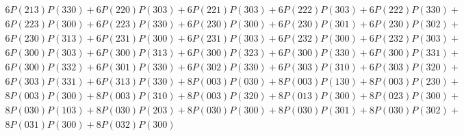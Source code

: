 \begin{align*}
	6P(213)P(330) + 6P(220)P(303) + 6P(221)P(303) + 6P(222)P(303) + 6P(222)P(330)+ \\
	6P(223)P(300) + 6P(223)P(330) + 6P(230)P(300) + 6P(230)P(301) + 6P(230)P(302)+ \\
	6P(230)P(313) + 6P(231)P(300) + 6P(231)P(303) + 6P(232)P(300) + 6P(232)P(303)+ \\
	6P(300)P(303) + 6P(300)P(313) + 6P(300)P(323) + 6P(300)P(330) + 6P(300)P(331)+ \\
	6P(300)P(332) + 6P(301)P(330) + 6P(302)P(330) + 6P(303)P(310) + 6P(303)P(320)+ \\
	6P(303)P(331) + 6P(313)P(330) + 8P(003)P(030) + 8P(003)P(130) + 8P(003)P(230)+ \\
	8P(003)P(300) + 8P(003)P(310) + 8P(003)P(320) + 8P(013)P(300) + 8P(023)P(300)+ \\
	8P(030)P(103) + 8P(030)P(203) + 8P(030)P(300) + 8P(030)P(301) + 8P(030)P(302)+ \\
	8P(031)P(300) + 8P(032)P(300)
\end{align*}